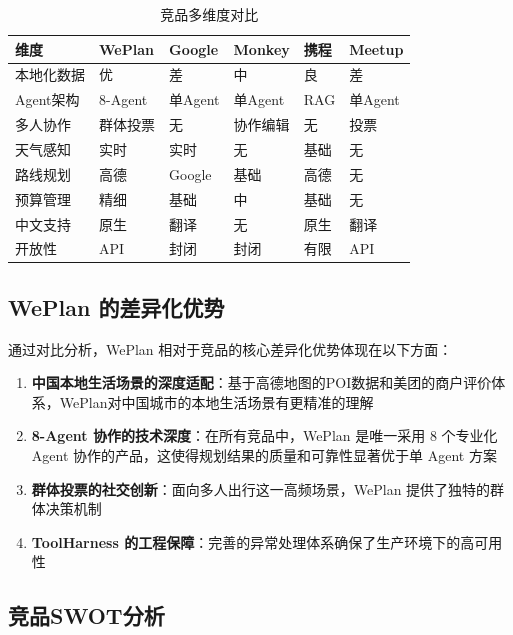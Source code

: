 \documentclass[12pt,a4paper]{ctexart}
\begin{document}
\begin{table}[H]
\centering
\caption{竞品多维度对比}
\label{tab:competitor-compare}
\renewcommand{\arraystretch}{1.3}
{\small
\begin{tabular}{p{2.5cm} p{2cm} p{2cm} p{2cm} p{2cm} p{2cm}}
\toprule
\textbf{维度} & \textbf{WePlan} & \textbf{Google} & \textbf{Monkey} & \textbf{携程} & \textbf{Meetup} \\
\midrule
本地化数据 & 优 & 差 & 中 & 良 & 差 \\
Agent架构 & 8-Agent & 单Agent & 单Agent & RAG & 单Agent \\
多人协作 & 群体投票 & 无 & 协作编辑 & 无 & 投票 \\
天气感知 & 实时 & 实时 & 无 & 基础 & 无 \\
路线规划 & 高德 & Google & 基础 & 高德 & 无 \\
预算管理 & 精细 & 基础 & 中 & 基础 & 无 \\
中文支持 & 原生 & 翻译 & 无 & 原生 & 翻译 \\
开放性 & API & 封闭 & 封闭 & 有限 & API \\
\bottomrule
\end{tabular}
}
\end{table}

\subsection{WePlan 的差异化优势}

通过对比分析，WePlan 相对于竞品的核心差异化优势体现在以下方面：

\begin{enumerate}[leftmargin=2em]
  \item \textbf{中国本地生活场景的深度适配}：基于高德地图的POI数据和美团的商户评价体系，WePlan对中国城市的本地生活场景有更精准的理解
  \item \textbf{8-Agent 协作的技术深度}：在所有竞品中，WePlan 是唯一采用 8 个专业化 Agent 协作的产品，这使得规划结果的质量和可靠性显著优于单 Agent 方案
  \item \textbf{群体投票的社交创新}：面向多人出行这一高频场景，WePlan 提供了独特的群体决策机制
  \item \textbf{ToolHarness 的工程保障}：完善的异常处理体系确保了生产环境下的高可用性
\end{enumerate}

\subsection{竞品SWOT分析}
\end{document}
